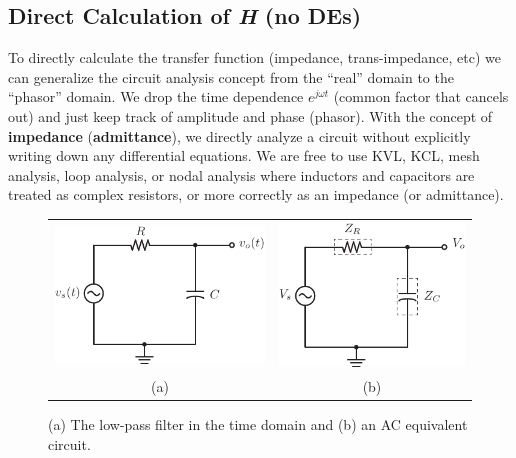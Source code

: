 \subsection{Direct Calculation of \textit{H} (no DEs)}
To directly calculate the transfer function (impedance, trans-impedance, etc) we can generalize the circuit analysis concept from the “real” domain to the “phasor” domain.   We drop the time dependence $e^{j\omega t}$ (common factor that cancels out) and just keep track of amplitude and phase (phasor).  With the concept of \textbf{impedance} (\textbf{admittance}), we directly analyze a circuit without explicitly writing down any differential equations.  We are free to use KVL, KCL, mesh analysis, loop analysis, or nodal analysis where inductors and capacitors are treated as complex resistors, or more correctly as an impedance (or admittance).
\newpage
\begin{figure}[t]
\centering
\begin{tabular}{cc}
\includegraphics[angle=-0.0,scale=1]{mod1_3_5_rc_lpf} &
\includegraphics[angle=-0.0,scale=1]{mod1_3_6_rc_lpf_Z}\\
(a) & (b)\\
\end{tabular}
\caption{(a) The low-pass filter in the time domain and (b) an AC equivalent circuit.}
\label{fig:lpfagain}
\end{figure}
